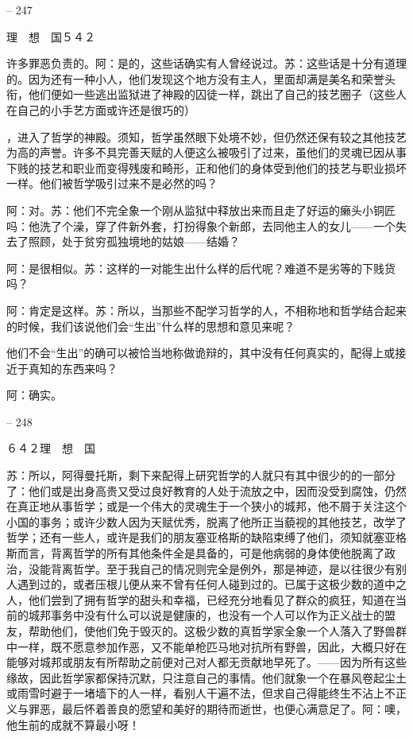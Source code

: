 \documentclass[11pt,oneside]{book}
\begin{document}
\begin{common-format}
    

-- 247

    理　想　国５４２

    许多罪恶负责的。阿：是的，这些话确实有人曾经说过。苏：这些话是十分有道理的。因为还有一种小人，他们发现这个地方没有主人，里面却满是美名和荣誉头衔，他们便如一些逃出监狱进了神殿的囚徒一样，跳出了自己的技艺圈子（这些人在自己的小手艺方面或许还是很巧的）

    ，进入了哲学的神殿。须知，哲学虽然眼下处境不妙，但仍然还保有较之其他技艺为高的声誉。许多不具完善天赋的人便这么被吸引了过来，虽他们的灵魂已因从事下贱的技艺和职业而变得残废和畸形，正和他们的身体受到他们的技艺与职业损坏一样。他们被哲学吸引过来不是必然的吗？

    阿：对。苏：他们不完全象一个刚从监狱中释放出来而且走了好运的癞头小铜匠吗：他洗了个澡，穿了件新外套，打扮得象个新郎，去同他主人的女儿——一个失去了照顾，处于贫穷孤独境地的姑娘——结婚？

    阿：是很相似。苏：这样的一对能生出什么样的后代呢？难道不是劣等的下贱货吗？

    阿：肯定是这样。苏：所以，当那些不配学习哲学的人，不相称地和哲学结合起来的时候，我们该说他们会“生出”什么样的思想和意见来呢？

    他们不会“生出”的确可以被恰当地称做诡辩的，其中没有任何真实的，配得上或接近于真知的东西来吗？

    阿：确实。

    

-- 248

    ６４２理　想　国

    苏：所以，阿得曼托斯，剩下来配得上研究哲学的人就只有其中很少的的一部分了：他们或是出身高贵又受过良好教育的人处于流放之中，因而没受到腐蚀，仍然在真正地从事哲学；或是一个伟大的灵魂生于一个狭小的城邦，他不屑于关注这个小国的事务；或许少数人因为天赋优秀，脱离了他所正当藐视的其他技艺，改学了哲学；还有一些人，或许是我们的朋友塞亚格斯的缺陷束缚了他们，须知就塞亚格斯而言，背离哲学的所有其他条件全是具备的，可是他病弱的身体使他脱离了政治，没能背离哲学。至于我自己的情况则完全是例外，那是神迹，是以往很少有别人遇到过的，或者压根儿便从来不曾有任何人碰到过的。已属于这极少数的道中之人，他们尝到了拥有哲学的甜头和幸福，已经充分地看见了群众的疯狂，知道在当前的城邦事务中没有什么可以说是健康的，也没有一个人可以作为正义战士的盟友，帮助他们，使他们免于毁灭的。这极少数的真哲学家全象一个人落入了野兽群中一样，既不愿意参加作恶，又不能单枪匹马地对抗所有野兽，因此，大概只好在能够对城邦或朋友有所帮助之前便对己对人都无贡献地早死了。——因为所有这些缘故，因此哲学家都保持沉默，只注意自己的事情。他们就象一个在暴风卷起尘土或雨雪时避于一堵墙下的人一样，看别人干遍不法，但求自己得能终生不沾上不正义与罪恶，最后怀着善良的愿望和美好的期待而逝世，也便心满意足了。阿：噢，他生前的成就不算最小呀！


\end{common-format}
\end{document}
